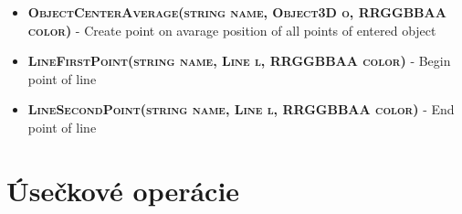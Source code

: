 \begin{itemize}
\item \textsc{\textbf{ObjectCenterAverage(string name, Object3D o, RRGGBBAA color)}} - Create point on avarage position of all points of entered object

\item \textsc{\textbf{LineFirstPoint(string name, Line l, RRGGBBAA color)}} - Begin point of line

\item \textsc{\textbf{LineSecondPoint(string name, Line l, RRGGBBAA color)}} - End point of line

\end{itemize}

\section*{Úsečkové operácie}
		

